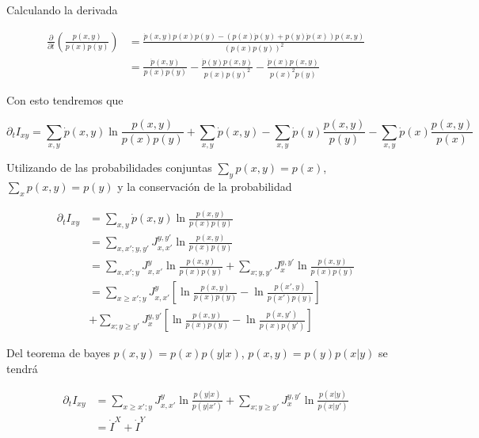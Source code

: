 \begin{appendixs}
 Calculando la derivada

\begin{align*}
    \frac{\partial }{\partial t} \left( \frac{p(x,y)}{p(x)p(y)} \right) & = \frac{ \dot{p}(x,y)p(x)p(y) - (p(x)\dot{p}(y) + p(y)\dot{p}(x))p(x,y)   }{ (p(x)p(y))^{2} } \\
    & = \frac{\dot{p}(x,y)}{p(x)p(y) } - \frac{\dot{p}(y)p(x,y)  }{ p(x)p(y)^{2} } - \frac{\dot{p}(x)p(x,y)  }{ p(x)^{2}p(y) }  
\end{align*}

Con esto tendremos que

\begin{equation*}
    \partial_{t}I_{xy} = \sum_{x,y}\dot{p}(x,y) \ln \frac{p(x,y)}{ p(x)p(y) } + \sum_{x,y} \dot{p}(x,y) - \sum_{x,y} \dot{p}(y) \frac{p(x,y)}{p(y)} - \sum_{x,y} \dot{p}(x) \frac{p(x,y)}{p(x)} 
\end{equation*}

Utilizando de las probabilidades conjuntas $\sum_{y}p(x,y) = p(x)$, $\sum_{x}p(x,y)  = p(y)$ y la conservación de la probabilidad

\begin{align*}
    \partial_{t}I_{xy} & = \sum_{x,y}\dot{p}(x,y) \ln \frac{p(x,y)}{ p(x)p(y) } \\
    & = \sum_{x,x';y,y'}J_{x,x'}^{y,y'} \ln \frac{p(x,y)}{ p(x)p(y) } \\
    & = \sum_{x,x';y}J_{x,x'}^{y} \ln \frac{p(x,y)}{p(x)p(y)} + \sum_{x;y,y'}J_{x}^{y,y'} \ln \frac{p(x,y)}{p(x)p(y)} \\
    & = \sum_{x\geq x';y}J_{x,x'}^{y} \left[ \ln \frac{p(x,y)}{p(x)p(y)} - \ln \frac{p(x',y)}{p(x')p(y)}  \right] \\
    & + \sum_{x;y\geq y'} J_{x}^{y,y'} \left[ \ln \frac{p(x,y)}{p(x)p(y)} - \ln \frac{p(x,y')}{p(x)p(y')} \right]
\end{align*}

Del teorema de bayes $p(x,y) = p(x)p(y|x)$, $p(x,y) = p(y)p(x|y)$ se tendrá

\begin{align*}
    \partial_{t}I_{xy} & = \sum_{x \geq x';y} J_{x,x'}^{y} \ln \frac{p(y|x) }{p(y|x')} + \sum_{x;y\geq y'} J_{x}^{y,y'} \ln \frac{p(x|y) }{p(x|y')} \\
                       & = \dot{I}^{X} + \dot{I}^{Y} 
\end{align*}

    \label{apendix4:secondlaw}



\end{appendixs}
